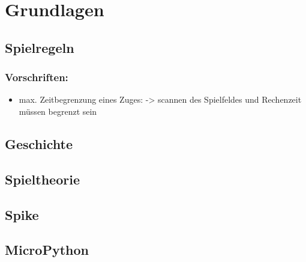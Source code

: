 \chapter{Grundlagen}
\label{cha:Grundlagen}

%
%
\section{Spielregeln}
\subsection{Vorschriften:}
\begin{itemize}
	\item max. Zeitbegrenzung eines Zuges: -> scannen des Spielfeldes und Rechenzeit müssen begrenzt sein
\end{itemize}
\section{Geschichte}
\section{Spieltheorie}
\section{Spike}
\section{MicroPython}